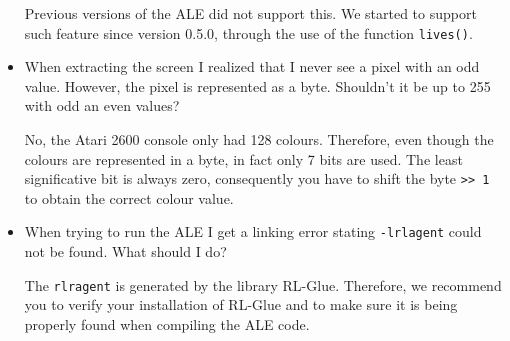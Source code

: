 \documentclass[12pt]{article}
\begin{document}
\begin{itemize}
Previous versions of the ALE did not support this. We started to support such feature since version 
0.5.0, through the use of the function \verb+lives()+.

\item When extracting the screen I realized that I never see a pixel with an odd value. However,
the pixel is represented as a byte. Shouldn't it be up to 255 with odd an even values?

No, the Atari 2600 console only had 128 colours. Therefore, even though the colours are represented 
in a byte, in fact only 7 bits are used. The least significative bit is always zero, consequently you have
to shift the byte \verb+>> 1+ to obtain the correct colour value.

\item When trying to run the ALE I get a linking error stating \verb+-lrlagent+ could not be found.  
What should I do?

The \verb+rlragent+ is generated by the library RL-Glue. Therefore, we recommend you to verify your 
installation of RL-Glue and to make sure it is being properly found when compiling the ALE code.

\end{itemize}
\end{document}
